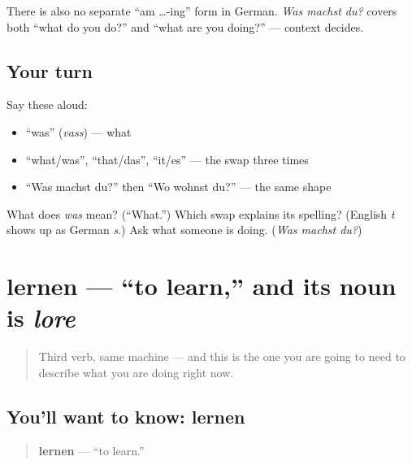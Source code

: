 There is also no separate \textquotedblleft{}am …-ing\textquotedblright{} form in German. \emph{Was machst du?} covers both \textquotedblleft{}what do you do?\textquotedblright{} and \textquotedblleft{}what are you doing?\textquotedblright{} — context decides.

\subsection*{Your turn}
Say these aloud:

\begin{itemize}
\raggedright
  \item \textquotedblleft{}was\textquotedblright{} (\emph{vass}) — what
  \item \textquotedblleft{}what/was\textquotedblright{}, \textquotedblleft{}that/das\textquotedblright{}, \textquotedblleft{}it/es\textquotedblright{} — the swap three times
  \item \textquotedblleft{}Was machst du?\textquotedblright{} then \textquotedblleft{}Wo wohnst du?\textquotedblright{} — the same shape
\end{itemize}

\begin{tcolorbox}[breakable,colback=teal!4,colframe=teal!35!black,title={Before you move on}]
What does \emph{was} mean? (\textquotedblleft{}What.\textquotedblright{}) Which swap explains its spelling? (English \emph{t} shows up as German \emph{s}.) Ask what someone is doing. (\emph{Was machst du?})
\end{tcolorbox}
\section[lernen]{lernen — \textquotedblleft{}to learn,\textquotedblright{} and its noun is \emph{lore}}

\label{lesson:GE-C05-lernen}



\begin{quote}
Third verb, same machine — and this is the one you are going to need to describe what you are doing right now.
\end{quote}

\subsection*{You'll want to know: lernen}
\begin{quote}
\textbf{lernen} — \textquotedblleft{}to learn.\textquotedblright{}
\end{quote}

